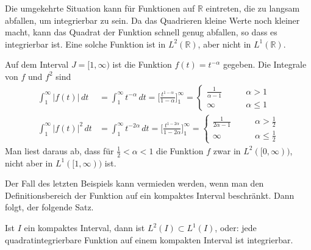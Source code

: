 Die umgekehrte Situation kann für Funktionen auf $\mathbb R$ eintreten,
die zu langsam abfallen, um integrierbar zu sein. 
Da das Quadrieren kleine Werte noch kleiner macht, kann das Quadrat
der Funktion schnell genug abfallen, so dass es integrierbar ist.
Eine solche Funktion ist in $L^2(\mathbb R)$, aber nicht in $L^1(\mathbb R)$.

\begin{beispiel}
Auf dem Interval $J=[1,\infty)$ ist die Funktion
$f(t)=t^{-\alpha}$ gegeben.
Die Integrale von $f$ und $f^2$ sind
\begin{align*}
\int_1^\infty |f(t)|\,dt
&=
\int_1^\infty t^{-\alpha}\,dt
=
\biggl[\frac{t^{1-\alpha}}{1-\alpha}\biggr]_1^\infty
=
\begin{cases}
\frac{1}{\alpha-1}&\qquad \alpha > 1\\
\infty &\qquad \alpha \le 1
\end{cases}
\\
\int_1^\infty |f(t)|^2\,dt
&=
\int_1^\infty t^{-2\alpha}\,dt
=
\biggl[\frac{t^{1-2\alpha}}{1-2\alpha}\biggr]_1^\infty
=
\begin{cases}
\frac{1}{2\alpha-1}&\qquad \alpha > \frac12\\
\infty &\qquad \alpha \le \frac12
\end{cases}
\end{align*}
Man liest daraus ab, dass für $\frac12<\alpha < 1$ die Funktion $f$ zwar
in $L^2([0,\infty))$, nicht aber in $L^1([1,\infty))$ ist.
\end{beispiel}

Der Fall des letzten Beispiels kann vermieden werden, wenn man den
Definitionsbereich der Funktion auf ein kompaktes Interval beschränkt.
Dann folgt, der folgende Satz.

\begin{satz}
\label{satz:l2inl1}
Ist $I$ ein kompaktes Interval, dann ist $L^2(I)\subset L^1(I)$, oder:
jede quadratintegrierbare Funktion auf einem kompakten Interval ist 
integrierbar.
\end{satz}

